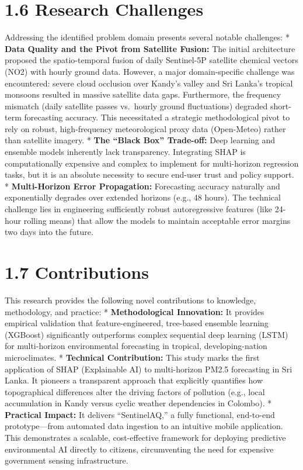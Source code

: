 \section{1.6 Research Challenges}\label{research-challenges}

Addressing the identified problem domain presents several notable
challenges: * \textbf{Data Quality and the Pivot from Satellite Fusion:}
The initial architecture proposed the spatio-temporal fusion of daily
Sentinel-5P satellite chemical vectors (NO2) with hourly ground data.
However, a major domain-specific challenge was encountered: severe cloud
occlusion over Kandy's valley and Sri Lanka's tropical monsoons resulted
in massive satellite data gaps. Furthermore, the frequency mismatch
(daily satellite passes vs.~hourly ground fluctuations) degraded
short-term forecasting accuracy. This necessitated a strategic
methodological pivot to rely on robust, high-frequency meteorological
proxy data (Open-Meteo) rather than satellite imagery. * \textbf{The
``Black Box'' Trade-off:} Deep learning and ensemble models inherently
lack transparency. Integrating SHAP is computationally expensive and
complex to implement for multi-horizon regression tasks, but it is an
absolute necessity to secure end-user trust and policy support. *
\textbf{Multi-Horizon Error Propagation:} Forecasting accuracy naturally
and exponentially degrades over extended horizons (e.g., 48 hours). The
technical challenge lies in engineering sufficiently robust
autoregressive features (like 24-hour rolling means) that allow the
models to maintain acceptable error margins two days into the future.

\section{1.7 Contributions}\label{contributions}

This research provides the following novel contributions to knowledge,
methodology, and practice: * \textbf{Methodological Innovation:} It
provides empirical validation that feature-engineered, tree-based
ensemble learning (XGBoost) significantly outperforms complex sequential
deep learning (LSTM) for multi-horizon environmental forecasting in
tropical, developing-nation microclimates. * \textbf{Technical
Contribution:} This study marks the first application of SHAP
(Explainable AI) to multi-horizon PM2.5 forecasting in Sri Lanka. It
pioneers a transparent approach that explicitly quantifies how
topographical differences alter the driving factors of pollution (e.g.,
local accumulation in Kandy versus cyclic weather dependencies in
Colombo). * \textbf{Practical Impact:} It delivers ``SentinelAQ,'' a
fully functional, end-to-end prototype---from automated data ingestion
to an intuitive mobile application. This demonstrates a scalable,
cost-effective framework for deploying predictive environmental AI
directly to citizens, circumventing the need for expensive government
sensing infrastructure.

